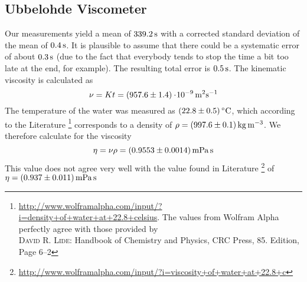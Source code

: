 \subsection{Ubbelohde Viscometer}
Our measurements yield a mean of $\unit[339.2]{s}$ with a corrected standard deviation of the mean of $\unit[0.4]{s}$. It is plausible to assume that there could be a systematic error of about $\unit[0.3]{s}$ (due to the fact that everybody tends to stop the time a bit too late at the end, for example). The resulting total error is $\unit[0.5]{s}$. The kinematic viscosity is calculated as
\[
    \nu = K t = \unit[(957.6 \pm 1.4)\e{-9}]{m^2 s^{-1}}
\]
The temperature of the water was measured as $(22.8 \pm 0.5)\C$, which according to the Literature%
\footnote{\url{http://www.wolframalpha.com/input/?i=density+of+water+at+22.8+celsius}. The values from Wolfram Alpha perfectly agree with those provided by \\ \textsc{David R. Lide}: Handbook of Chemistry and Physics, CRC Press, 85. Edition, Page 6--2}
corresponds to a density of $\rho = \unit[(997.6 \pm 0.1)]{kg\,m^{-3}}$. We therefore calculate for the viscosity
\[
    \eta =  \nu \rho = \unit[(0.9553 \pm0.0014)]{mPa\,s}
\]
This value does not agree very well with the value found in Literature%
\footnote{\url{http://www.wolframalpha.com/input/?i=viscosity+of+water+at+22.8+c}}
of $\eta = \unit[(0.937 \pm 0.011)]{mPa\, s}$

